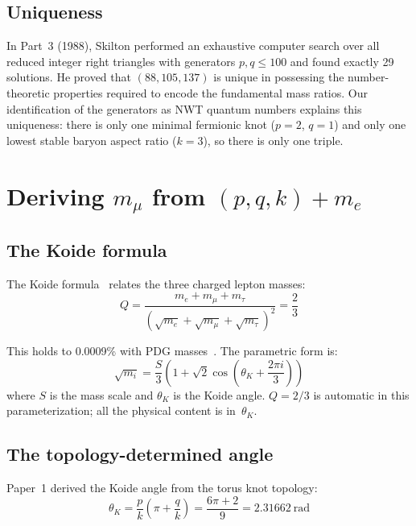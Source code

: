 \documentclass[11pt,a4paper]{article}
\begin{document}
\subsection{Uniqueness}

In Part~3 (1988), Skilton performed an exhaustive computer search over all reduced integer right triangles with generators $p, q \leq 100$ and found exactly 29 solutions. He proved that $(88, 105, 137)$ is unique in possessing the number-theoretic properties required to encode the fundamental mass ratios. Our identification of the generators as NWT quantum numbers explains this uniqueness: there is only one minimal fermionic knot ($p=2$, $q=1$) and only one lowest stable baryon aspect ratio ($k=3$), so there is only one triple.

\section{Deriving $m_\mu$ from $(p, q, k) + m_e$}
\label{sec:muon}

\subsection{The Koide formula}

The Koide formula~\cite{koide1983} relates the three charged lepton masses:
\begin{equation}
  Q = \frac{m_e + m_\mu + m_\tau}{(\sqrt{m_e} + \sqrt{m_\mu} + \sqrt{m_\tau})^2} = \frac{2}{3}
  \label{eq:koide}
\end{equation}

This holds to 0.0009\% with PDG masses~\cite{pdg2022}. The parametric form is:
\begin{equation}
  \sqrt{m_i} = \frac{S}{3}\left(1 + \sqrt{2}\cos\!\left(\theta_K + \frac{2\pi i}{3}\right)\right)
  \label{eq:koide-param}
\end{equation}
where $S$ is the mass scale and $\theta_K$ is the Koide angle. $Q = 2/3$ is automatic in this parameterization; all the physical content is in~$\theta_K$.

\subsection{The topology-determined angle}

Paper~1 derived the Koide angle from the torus knot topology:
\begin{equation}
  \theta_K = \frac{p}{k}\!\left(\pi + \frac{q}{k}\right) = \frac{6\pi + 2}{9} = 2.31662~\text{rad}
  \label{eq:koide-angle}
\end{equation}
\end{document}
